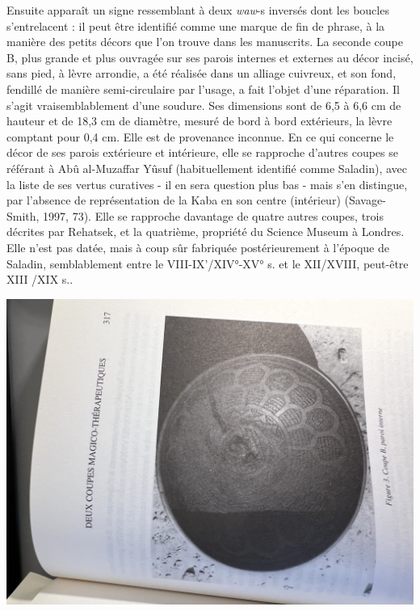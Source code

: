 Ensuite apparaît un signe ressemblant à deux \textit{waw}-s inversés dont les boucles s'entrelacent : il peut être identifié comme une marque de fin de phrase, à la manière des petits décors que l'on trouve dans les manuscrits.
La seconde coupe B, plus grande et plus ouvragée sur ses parois internes et externes au décor incisé, sans pied, à lèvre arrondie, a été réalisée dans un alliage cuivreux, et son fond, fendillé de manière semi-circulaire par l'usage, a fait l'objet d'une réparation. Il s'agit vraisemblablement d'une soudure. Ses dimensions sont de 6,5 à 6,6 cm de hauteur et de 18,3 cm de diamètre, mesuré de bord à bord extérieurs, la lèvre comptant pour 0,4 cm. Elle est de provenance inconnue. En ce qui concerne le décor de ses parois extérieure et intérieure, elle se rapproche d'autres coupes se référant à Abû al-Muzaffar Yûsuf (habituellement identifié comme Saladin), avec la liste de ses vertus curatives - il en sera question plus bas - mais s'en distingue, par l'absence de représentation de la Kaba en son centre (intérieur) (Savage-Smith, 1997, 73). Elle se rapproche davantage de quatre autres coupes, trois décrites par Rehatsek, et la quatrième, propriété du Science Museum à Londres. Elle n'est pas datée, mais à coup sûr fabriquée postérieurement à l'époque de Saladin,  semblablement entre le VIII-IX'/XIV°-XV° s. et le XII/XVIII, peut-être XIII /XIX s..

 \includegraphics[width=\textwidth]{HommeetIslam/Images/IMG_2457.JPG}

